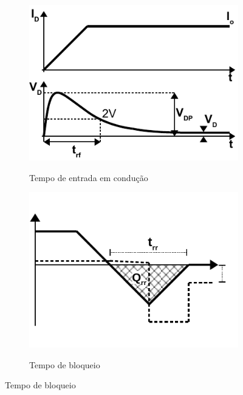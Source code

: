         \begin{figure}[H]
            \centering
            \caption{Comportamento dinâmico típico da tensão e corrente de um diodo}
            \begin{subfigure}[H]{.49\textwidth}
                \centering
                \caption{Tempo de entrada em condução}
                \includegraphics[scale=1]{pdf/perdas/perdas_diodo_c1_p.pdf}
                \label{fig:EMC_diodo_Econd}
            \end{subfigure}
            \begin{subfigure}[H]{.49\textwidth}
                \centering
                \caption{Tempo de bloqueio}
                \includegraphics[scale=1]{pdf/perdas/perdas_diodo_c2_p.pdf}
                \label{fig:EMC_diodo_Bcond}
            \end{subfigure}
        	\label{fig:EMC_diodo_EBcond}
        \end{figure}
        
